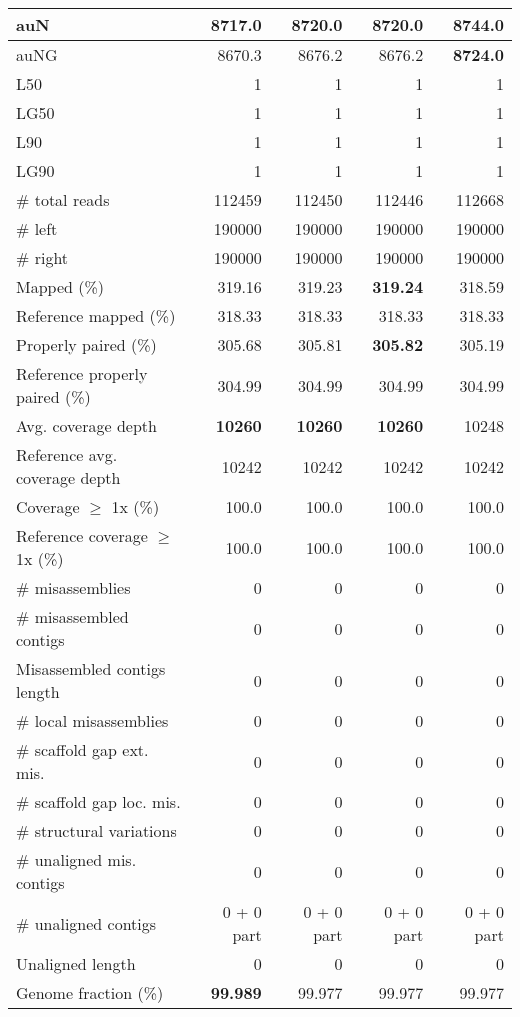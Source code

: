 \documentclass[12pt,a4paper]{article}
\begin{document}
\begin{table}[ht]
\begin{center}
\begin{tabular}{|l*{4}{|r}|}
auN & 8717.0 & 8720.0 & 8720.0 & {\bf 8744.0} \\ \hline
auNG & 8670.3 & 8676.2 & 8676.2 & {\bf 8724.0} \\ \hline
L50 & 1 & 1 & 1 & 1 \\ \hline
LG50 & 1 & 1 & 1 & 1 \\ \hline
L90 & 1 & 1 & 1 & 1 \\ \hline
LG90 & 1 & 1 & 1 & 1 \\ \hline
\# total reads & 112459 & 112450 & 112446 & 112668 \\ \hline
\# left & 190000 & 190000 & 190000 & 190000 \\ \hline
\# right & 190000 & 190000 & 190000 & 190000 \\ \hline
Mapped (\%) & 319.16 & 319.23 & {\bf 319.24} & 318.59 \\ \hline
Reference mapped (\%) & 318.33 & 318.33 & 318.33 & 318.33 \\ \hline
Properly paired (\%) & 305.68 & 305.81 & {\bf 305.82} & 305.19 \\ \hline
Reference properly paired (\%) & 304.99 & 304.99 & 304.99 & 304.99 \\ \hline
Avg. coverage depth & {\bf 10260} & {\bf 10260} & {\bf 10260} & 10248 \\ \hline
Reference avg. coverage depth & 10242 & 10242 & 10242 & 10242 \\ \hline
Coverage $\geq$ 1x (\%) & 100.0 & 100.0 & 100.0 & 100.0 \\ \hline
Reference coverage $\geq$ 1x (\%) & 100.0 & 100.0 & 100.0 & 100.0 \\ \hline
\# misassemblies & 0 & 0 & 0 & 0 \\ \hline
\# misassembled contigs & 0 & 0 & 0 & 0 \\ \hline
Misassembled contigs length & 0 & 0 & 0 & 0 \\ \hline
\# local misassemblies & 0 & 0 & 0 & 0 \\ \hline
\# scaffold gap ext. mis. & 0 & 0 & 0 & 0 \\ \hline
\# scaffold gap loc. mis. & 0 & 0 & 0 & 0 \\ \hline
\# structural variations & 0 & 0 & 0 & 0 \\ \hline
\# unaligned mis. contigs & 0 & 0 & 0 & 0 \\ \hline
\# unaligned contigs & 0 + 0 part & 0 + 0 part & 0 + 0 part & 0 + 0 part \\ \hline
Unaligned length & 0 & 0 & 0 & 0 \\ \hline
Genome fraction (\%) & {\bf 99.989} & 99.977 & 99.977 & 99.977 \\ \hline

\end{tabular}
\end{center}
\end{table}
\end{document}
